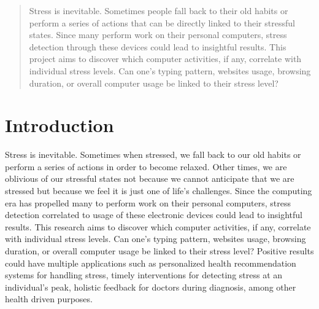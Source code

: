 \documentclass{article}
\begin{document}
 


\begin{abstract} 
Stress is inevitable. Sometimes people fall back to their old habits or perform a series of actions that can be directly linked to their stressful states. Since many perform work on their personal computers, stress detection through these devices could lead to insightful results. This project aims to discover which computer activities, if any, correlate with individual stress levels. Can one’s typing pattern, websites usage, browsing duration, or overall computer usage be linked to their stress level?
\end{abstract} 

\section{Introduction}
\label{introduction}

Stress is inevitable. Sometimes when stressed, we fall back to our old habits or perform a series of actions in order to become relaxed. Other times, we are oblivious of our stressful states not because we cannot anticipate that we are stressed but because we feel it is just one of life’s challenges. Since the computing era has propelled many to perform work on their personal computers, stress detection correlated to usage of these electronic devices could lead to insightful results. This research aims to discover which computer activities, if any, correlate with individual stress levels. Can one’s typing pattern, websites usage, browsing duration, or overall computer usage be linked to their stress level? Positive results could have multiple applications such as personalized health recommendation systems for handling stress, timely interventions for detecting stress at an individual’s peak, holistic feedback for doctors during diagnosis, among other health driven purposes. 
\end{document}
